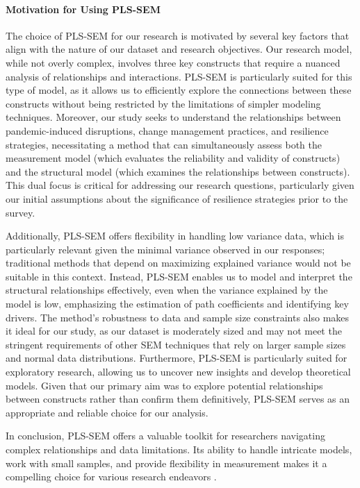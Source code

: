 \paragraph{Motivation for Using PLS-SEM}

The choice of PLS-SEM for our research is motivated by several key factors that align with the nature of our dataset and research objectives. Our research model, while not overly complex, involves three key constructs that require a nuanced analysis of relationships and interactions. PLS-SEM is particularly suited for this type of model, as it allows us to efficiently explore the connections between these constructs without being restricted by the limitations of simpler modeling techniques. Moreover, our study seeks to understand the relationships between pandemic-induced disruptions, change management practices, and resilience strategies, necessitating a method that can simultaneously assess both the measurement model (which evaluates the reliability and validity of constructs) and the structural model (which examines the relationships between constructs). This dual focus is critical for addressing our research questions, particularly given our initial assumptions about the significance of resilience strategies prior to the survey.

Additionally, PLS-SEM offers flexibility in handling low variance data, which is particularly relevant given the minimal variance observed in our responses; traditional methods that depend on maximizing explained variance would not be suitable in this context. Instead, PLS-SEM enables us to model and interpret the structural relationships effectively, even when the variance explained by the model is low, emphasizing the estimation of path coefficients and identifying key drivers. The method's robustness to data and sample size constraints also makes it ideal for our study, as our dataset is moderately sized and may not meet the stringent requirements of other SEM techniques that rely on larger sample sizes and normal data distributions. Furthermore, PLS-SEM is particularly suited for exploratory research, allowing us to uncover new insights and develop theoretical models. Given that our primary aim was to explore potential relationships between constructs rather than confirm them definitively, PLS-SEM serves as an appropriate and reliable choice for our analysis.

\noindent In conclusion, PLS-SEM offers a valuable toolkit for researchers navigating complex relationships and data limitations. Its ability to handle intricate models, work with small samples, and provide flexibility in measurement makes it a compelling choice for various research endeavors \parencite{Tenenhaus2005PLSModeling}.

